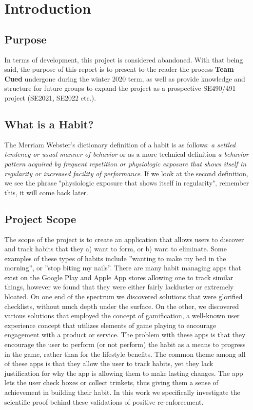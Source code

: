 \section{Introduction}

\subsection{Purpose}
In terms of development, this project is considered abandoned. With that being said, the purpose of this report is to present to the reader the process \textbf{Team Cued} undergone during the winter 2020 term, as well as provide knowledge and structure for future groups to expand the project as a prospective SE490/491 project (SE2021, SE2022 etc.).
\subsection{What is a Habit?}
The Merriam Webster's dictionary definition of a habit is as follows: \textit{a settled tendency or usual manner of behavior} or as a more technical definition \textit{a behavior pattern acquired by frequent repetition or physiologic exposure that shows itself in regularity or increased facility of performance}. If we look at the second definition, we see the phrase "physiologic exposure that shows itself in regularity", remember this, it will come back later. 

\subsection{Project Scope}
The scope of the project is to create an application that allows users to discover and track habits that they a) want to form, or b) want to eliminate. Some examples of these types of habits include ”wanting to make my bed in the morning”, or ”stop biting my nails”. There are many habit managing apps that exist on the Google Play and Apple App stores allowing one to track similar things, however we found that they were either fairly lackluster or extremely bloated. On one end of the spectrum we discovered solutions that were glorified checklists, without much depth under the surface. On the other, we discovered various solutions that employed the concept of gamification, a well-known user experience concept that utilizes elements of game playing to encourage engagement with a product or service. The problem with these apps is that they encourage the user to perform (or not perform) the habit as a means to progress in the game, rather than for the lifestyle benefits. The common theme among all of these apps is that they allow the user to track habits, yet they lack  justification for why the app is allowing them to make lasting changes. The app lets the user check boxes or collect trinkets, thus giving them a sense of achievement in building their habit. In this work we specifically investigate the scientific proof behind these validations of positive re-enforcement.
